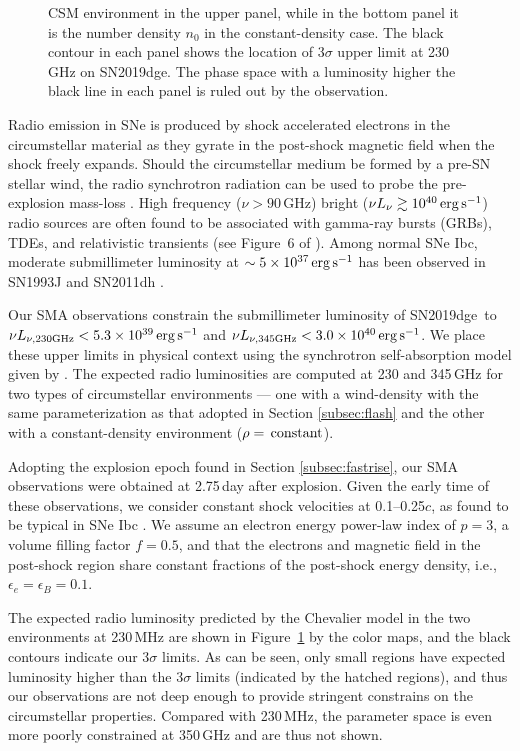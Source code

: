 \documentclass[twocolumn]{aastex63}
\newcommand{\name}{SN2019dge}
\begin{document}
\begin{CJK*}{UTF8}{gbsn}
\begin{figure}[htbp!]
{	CSM environment in the upper panel, while in the bottom panel it is the number density $n_0$ in the 
	constant-density case. The black contour in each panel shows the location of 3$\sigma$ upper limit 
	at 230\,GHz on \name. The phase space with a luminosity higher the black line in each panel is ruled 
	out by the 
	observation.
		\label{fig:radio}}
\end{figure}
Radio emission in SNe is produced by shock accelerated electrons in the circumstellar material as they 
gyrate in the post-shock magnetic field when the shock freely expands. Should the circumstellar 
medium be formed by a pre-SN stellar wind, the radio synchrotron radiation can be used to probe the 
pre-explosion mass-loss \citep{Chevalier1982}. High frequency ($\nu>90$\,GHz) bright 
($\nu L_\nu \gtrsim 10^{40} \, \rm erg\, 
s^{-1}$) radio sources are often found to be associated with gamma-ray bursts (GRBs), TDEs, and 
relativistic transients (see Figure~6 of \citealt{HoPhinney2019}). Among normal SNe Ibc, moderate 
submillimeter luminosity at $\sim 5\times 10^{37}\, \rm erg\, s^{-1}$ has been observed in SN1993J 
\citep{Weiler2007} and SN2011dh \citep{Horesh2013}.

Our SMA observations constrain the submillimeter luminosity of \name\ to $\nu L_{\nu \rm , 
230GHz} < 5.3\times 10^{39}\, \rm erg\, s^{-1}$ and $\nu L_{\nu \rm , 345GHz} < 3.0\times 10^{40}\, \rm 
erg\, s^{-1}$. We place these upper limits in physical context using the synchrotron self-absorption 
model given by \citet{Chevalier1998}. The expected radio luminosities are computed at 230 and 
345\,GHz for two types of circumstellar environments --- one with a wind-density with the same 
parameterization as that adopted in Section \ref{subsec:flash} and the other with a constant-density 
environment ($\rho = \,{\rm constant}$). 

Adopting the explosion epoch found in Section \ref{subsec:fastrise}, our SMA observations were 
obtained at 2.75\,day after explosion. Given the early time of these observations, we consider constant 
shock velocities at 0.1--0.25$c$, as found to be typical in SNe Ibc \citep{Wellons2012}. We assume an 
electron energy power-law index of $p = 3$, a volume filling factor $f=0.5$, and that the electrons 
and magnetic field in the post-shock region share constant fractions of the post-shock energy 
density, i.e., $\epsilon_e = \epsilon_B = 0.1$.

The expected radio luminosity predicted by the Chevalier model in the two environments 
at 230\,MHz are shown in Figure~\ref{fig:radio} by the color maps, and the black contours indicate our 
$3\sigma$ limits. As can be seen, only small regions have expected luminosity higher than the 
$3\sigma$ limits (indicated by the hatched regions), and thus our observations are not deep enough to 
provide stringent constrains on the circumstellar properties. Compared with 230\,MHz, the parameter 
space is even more poorly constrained at 350\,GHz and are thus not shown.


\end{CJK*}
\end{document}
